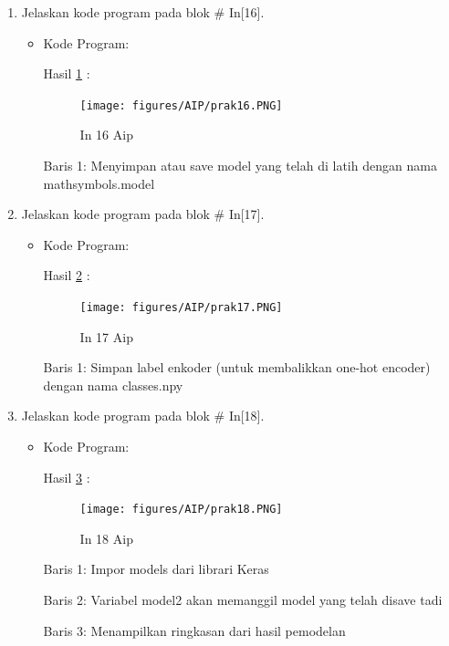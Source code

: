 \begin{enumerate}
\item Jelaskan kode program pada blok \# In[16].
\begin{itemize}
\item Kode Program:

\par Hasil \ref{in16aip} :
\begin{figure}[!hbtp]
\centering
\texttt{[image: figures/AIP/prak16.PNG]}
\caption{In 16 Aip}
\label{in16aip}
\end{figure}
\par Baris 1: Menyimpan atau save model yang telah di latih dengan nama mathsymbols.model 
\end{itemize}
\par

\item Jelaskan kode program pada blok \# In[17].
\begin{itemize}
\item Kode Program:

\par Hasil \ref{in17aip} :
\begin{figure}[!hbtp]
\centering
\texttt{[image: figures/AIP/prak17.PNG]}
\caption{In 17 Aip}
\label{in17aip}
\end{figure}
\par Baris 1: Simpan label enkoder (untuk membalikkan one-hot encoder) dengan nama classes.npy
\end{itemize}
\par

\item Jelaskan kode program pada blok \# In[18].
\begin{itemize}
\item Kode Program:

\par Hasil \ref{in18aip} :
\begin{figure}[!hbtp]
\centering
\texttt{[image: figures/AIP/prak18.PNG]}
\caption{In 18 Aip}
\label{in18aip}
\end{figure}
\par Baris 1: Impor models dari librari Keras
\par Baris 2: Variabel model2 akan memanggil model yang telah disave tadi 
\par Baris 3:  Menampilkan ringkasan dari hasil pemodelan
\end{itemize}
\par



\end{enumerate}
